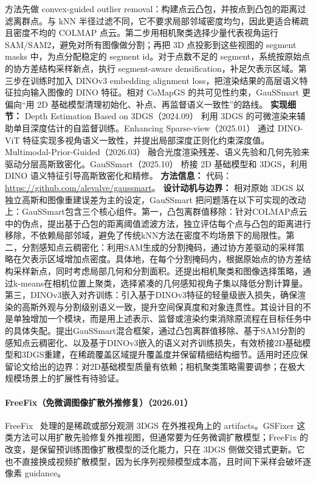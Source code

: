 方法先做 convex-guided outlier removal：构建点云凸包，并按点到凸包的距离过滤离群点。与 kNN 半径过滤不同，它不要求局部邻域密度均匀，因此更适合稀疏且密度不均的 COLMAP 点云。第二步用相机聚类选择少量代表视角运行 SAM/SAM2，避免对所有图像做分割；再把 3D 点投影到这些视图的 segment masks 中，为点分配稳定的 segment id。对于点数不足的 segment，系统按原始点的协方差结构采样新点，执行 segment-aware densification，补足欠表示区域。第三步在训练时加入 DINOv3 embedding alignment loss，把渲染结果的高层语义特征拉向输入图像的 DINO 特征。相对 CoMapGS 的共可见性约束，GauSSmart 更偏向“用 2D 基础模型清理初始化、补点、再监督语义一致性”的路线。
\textbf{实现细节：} Depth Estimation Based on 3DGS（2024.09） 利用 3DGS 的可微渲染来辅助单目深度估计的自监督训练。Enhancing Sparse-view（2025.01） 通过 DINO-ViT 特征实现多视角语义一致性，并提出局部深度正则化约束深度值。Multimodal-Prior-Guided（2026.03） 融合光度渲染残差、语义先验和几何先验来驱动分层高斯致密化。GauSSmart（2025.10） 桥接 2D 基础模型和 3DGS，利用 DINO 语义特征引导高斯致密化和精修。 %
\textbf{方法信息：} 代码：\url{https://github.com/alevalve/gaussmart}。
\textbf{设计动机与边界：} 相对原始 3DGS 以独立高斯和图像重建误差为主的设定，GauSSmart 把问题落在以下可实现的改动上：GauSSmart包含三个核心组件。第一，凸包离群值移除：针对COLMAP点云中的伪点，提出基于凸包的距离阈值滤波方法，独立评估每个点与凸包的距离进行移除，不依赖局部邻域，避免了传统kNN方法在密度不均场景下的局限性。第二，分割感知点云稠密化：利用SAM生成的分割掩码，通过协方差驱动的采样策略在欠表示区域增加点密度。具体地，在每个分割掩码内，根据原始点的协方差结构采样新点，同时考虑局部几何和分割面积。还提出相机聚类和图像选择策略，通过k-means在相机位置上聚类，选择紧凑的几何感知视角子集以降低分割计算量。第三，DINOv3嵌入对齐训练：引入基于DINOv3特征的轻量级嵌入损失，确保渲染的高斯外观与分割级别语义一致，提升空间保真度和对象连贯性。其设计目的不是单独增加一个模块，而是用上述表示、监督或渲染约束消除原流程在目标任务中的具体失配。提出GauSSmart混合框架，通过凸包离群值移除、基于SAM分割的感知点云稠密化、以及基于DINOv3嵌入的语义对齐训练损失，有效桥接2D基础模型和3DGS重建，在稀疏覆盖区域提升覆盖度并保留精细结构细节。适用时还应保留论文给出的边界：对2D基础模型质量有依赖；相机聚类策略需要调参；在极大规模场景上的扩展性有待验证。
\paragraph{FreeFix（免微调图像扩散外推修复）（2026.01）}
FreeFix~\cite{2601_20857} 处理的是稀疏或部分观测 3DGS 在外推视角上的 artifacts。GSFixer 这类方法可以用扩散先验修复外推视图，但通常要为任务微调扩散模型；FreeFix 的改变，是保留预训练图像扩散模型的泛化能力，只在 3DGS 侧做交错式更新。它也不直接换成视频扩散模型，因为长序列视频模型成本高，且时间下采样会破坏逐像素 guidance。

